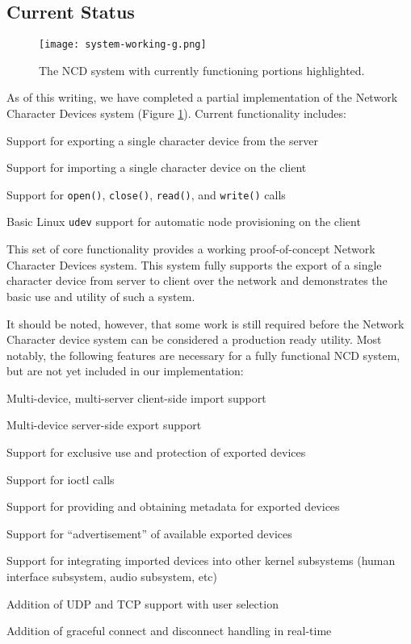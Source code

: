 \documentclass[11pt,twocolumn]{article}
\newenvironment{packed_item}{
\begin{itemize}
  \setlength{\itemsep}{1pt}
  \setlength{\parskip}{0pt}
  \setlength{\parsep}{0pt}
}{\end{itemize}}
\begin{document}
\subsection{Current Status}
\label{sec:currentstatus}

\begin{figure}[h]
  \centering
  \texttt{[image: system-working-g.png]}
  \caption{The NCD system with currently functioning portions
    highlighted.}
  \label{fig:system-working}
\end{figure}

As of this writing, we have completed a partial implementation of
the Network Character Devices system (Figure
\ref{fig:system-working}). Current functionality includes:

\begin{packed_item}
\item Support for exporting a single character device from the server
\item Support for importing a single character device on the client
\item Support for \texttt{open()}, \texttt{close()}, \texttt{read()},
  and \texttt{write()} calls
\item Basic Linux \texttt{udev} support for automatic node
  provisioning on the client
\end{packed_item}

This set of core functionality provides a working proof-of-concept
Network Character Devices system. This system fully supports the
export of a single character device from server to client over the
network and demonstrates the basic use and utility of such a system.

It should be noted, however, that some work is still required before
the Network Character device system can be considered a production
ready utility. Most notably, the following features are necessary for
a fully functional NCD system, but are not yet included in our
implementation:

\begin{packed_item}
\item Multi-device, multi-server client-side import support
\item Multi-device server-side export support
\item Support for exclusive use and protection of exported devices
\item Support for ioctl calls
\item Support for providing and obtaining metadata for exported
  devices
\item Support for ``advertisement'' of available exported devices
\item Support for integrating imported devices into other kernel
  subsystems (human interface subsystem, audio subsystem, etc)
\item Addition of UDP and TCP support with user selection
\item Addition of graceful connect and disconnect handling in real-time
\end{packed_item}
\end{document}
